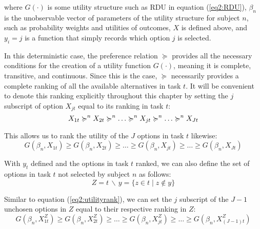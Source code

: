 \documentclass[11pt,a4paper]{report}
\begin{document}
\noindent where $G(\cdot)$ is some utility structure such as RDU in equation (\ref{eq2:RDU}), $\beta_n$ is the unobservable vector of parameters of the utility structure for subject $n$, such as probability weights and utilities of outcomes, $X$ is defined above, and $y_i=j$ is a function that simply records which option $j$ is selected.

In this deterministic case, the preference relation $\succcurlyeq$ provides all the necessary conditions for the creation of a utility function $G(\cdot)$, meaning it is complete, transitive, and continuous.
Since this is the case, $\succcurlyeq$ necessarily provides a complete ranking of all the available alternatives in task $t$.
It will be convenient to denote this ranking explicitly throughout this chapter by setting the $j$ subscript of option $X_{jt}$ equal to its ranking in task $t$:
\begin{equation}
	\label{eq2:outcomerank}
	X_{1t} \succcurlyeq^n X_{2t} \succcurlyeq^n \ldots \succcurlyeq^n X_{jt} \succcurlyeq^n \ldots \succcurlyeq^n X_{Jt}\\
\end{equation}

\noindent This allows us to rank the utility of the $J$ options in task $t$ likewise:
\begin{equation}
	\label{eq2:utilityrank}
	G(\beta_n,X_{1t}) \geq G(\beta_n,X_{2t}) \geq \ldots \geq G(\beta_n,X_{jt}) \geq \ldots \geq G(\beta_n,X_{Jt})
\end{equation}

With $y_t$ defined and the options in task $t$ ranked, we can also define the set of options in task $t$ not selected by subject $n$ as follows:
\begin{equation}
	\label{eq2:emptyset}
	Z = t \,\backslash\, y = \{z \in t \;|\; z \notin y \}
\end{equation}

Similar to equation (\ref{eq2:utilityrank}), we can set the $j$ subscript of the $J-1$ unchosen options in $Z$ equal to their respective ranking in $Z$:
\begin{equation}
	\label{eq2:Zutilityrank}
	G(\beta_n,X_{1t}^Z) \geq G(\beta_n,X_{2t}^Z) \geq \ldots \geq G(\beta_n,X_{jt}^Z) \geq \ldots \geq G(\beta_n,X_{(J-1)t}^Z)
\end{equation}
\end{document}
